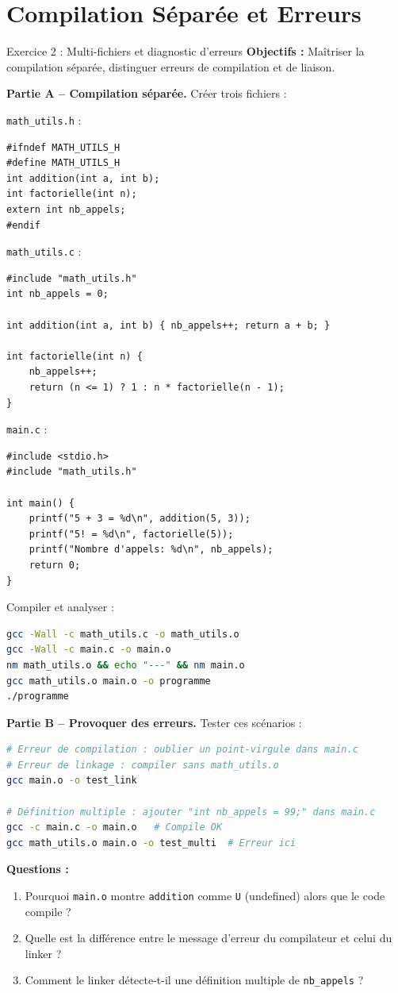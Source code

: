 \documentclass[10pt,a4paper]{article}
\begin{document}
\section{Compilation Séparée et Erreurs}

\begin{exercicebox}{Exercice 2 : Multi-fichiers et diagnostic d'erreurs}
\textbf{Objectifs :} Maîtriser la compilation séparée, distinguer erreurs de compilation et de liaison.

\textbf{Partie A -- Compilation séparée.} Créer trois fichiers :

\texttt{math\_utils.h} :
\begin{lstlisting}
#ifndef MATH_UTILS_H
#define MATH_UTILS_H
int addition(int a, int b);
int factorielle(int n);
extern int nb_appels;
#endif
\end{lstlisting}

\texttt{math\_utils.c} :
\begin{lstlisting}
#include "math_utils.h"
int nb_appels = 0;

int addition(int a, int b) { nb_appels++; return a + b; }

int factorielle(int n) {
    nb_appels++;
    return (n <= 1) ? 1 : n * factorielle(n - 1);
}
\end{lstlisting}

\texttt{main.c} :
\begin{lstlisting}
#include <stdio.h>
#include "math_utils.h"

int main() {
    printf("5 + 3 = %d\n", addition(5, 3));
    printf("5! = %d\n", factorielle(5));
    printf("Nombre d'appels: %d\n", nb_appels);
    return 0;
}
\end{lstlisting}

Compiler et analyser :
\begin{lstlisting}[language=bash]
gcc -Wall -c math_utils.c -o math_utils.o
gcc -Wall -c main.c -o main.o
nm math_utils.o && echo "---" && nm main.o
gcc math_utils.o main.o -o programme
./programme
\end{lstlisting}

\textbf{Partie B -- Provoquer des erreurs.} Tester ces scénarios :
\begin{lstlisting}[language=bash]
# Erreur de compilation : oublier un point-virgule dans main.c
# Erreur de linkage : compiler sans math_utils.o
gcc main.o -o test_link

# Définition multiple : ajouter "int nb_appels = 99;" dans main.c
gcc -c main.c -o main.o   # Compile OK
gcc math_utils.o main.o -o test_multi  # Erreur ici
\end{lstlisting}

\textbf{Questions :}
\begin{enumerate}
\item Pourquoi \texttt{main.o} montre \texttt{addition} comme \texttt{U} (undefined) alors que le code compile ?
\item Quelle est la différence entre le message d'erreur du compilateur et celui du linker ?
\item Comment le linker détecte-t-il une définition multiple de \texttt{nb\_appels} ?
\end{enumerate}
\end{exercicebox}
\end{document}
